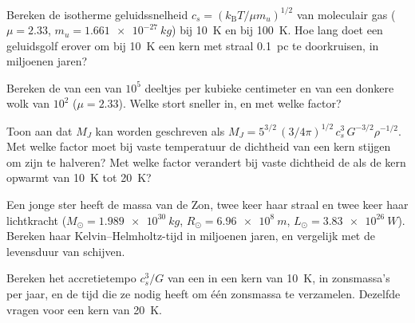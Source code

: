 \begin{exercise}[$\star$]\label{exo:b2:ism-star-formation:3}
Bereken de isotherme geluidssnelheid $c_s = (k_{\mathrm B}T/\mu m_u)^{1/2}$ van
moleculair gas ($\mu = 2.33$, $m_u = \qty{1.661e-27}{kg}$) bij \qty{10}{K} en bij
\qty{100}{K}. Hoe lang doet een geluidsgolf erover om bij \qty{10}{K} een kern met straal
\qty{0.1}{pc} te doorkruisen, in miljoenen jaren?
\end{exercise}

\begin{exercise}[$\star$]\label{exo:b2:ism-star-formation:4}
Bereken de  van een  van $10^5$ deeltjes per kubieke
centimeter en van een donkere wolk van $10^2$ ($\mu = 2.33$). Welke stort
sneller in, en met welke factor?
\end{exercise}

\begin{exercise}[$\star\star$]\label{exo:b2:ism-star-formation:5}
Toon aan dat $M_J$ kan worden geschreven als $M_J = 5^{3/2}\,(3/4\pi)^{1/2}\,c_s^3\,G^{-3/2}\rho^{-1/2}$.
Met welke factor moet bij vaste temperatuur de dichtheid van een kern stijgen om
zijn  te halveren? Met welke factor verandert bij vaste dichtheid de  als
de kern opwarmt van \qty{10}{K} tot \qty{20}{K}?
\end{exercise}

\begin{exercise}[$\star\star$]\label{exo:b2:ism-star-formation:6}
Een jonge ster heeft de massa van de Zon, twee keer haar straal en twee keer haar lichtkracht
($M_\odot = \qty{1.989e30}{kg}$, $R_\odot = \qty{6.96e8}{m}$,
$L_\odot = \qty{3.83e26}{W}$). Bereken haar Kelvin--Helmholtz-tijd in miljoenen
jaren, en vergelijk met de levensduur van schijven.
\end{exercise}

\begin{exercise}[$\star\star$]\label{exo:b2:ism-star-formation:7}
Bereken het accretietempo $c_s^3/G$ van een  in een kern van \qty{10}{K}, in
zonsmassa's per jaar, en de tijd die ze nodig heeft om één zonsmassa te verzamelen. Dezelfde
vragen voor een kern van \qty{20}{K}.
\end{exercise}

